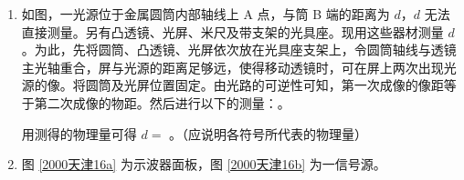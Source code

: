 \documentclass[\gkver]{gaokaozhenti}
\begin{document}
\begin{enumerate}
{（2）A、B 两球都从 O 点开始做平抛运动，且两球平抛时间相同；以平抛时间作为时间单位，则平抛的水平距离在数值上等于平抛初速度。设 A 未碰 B 时平抛水平位移为 $s_{A}$，A、B 相碰后，A、B 两球的水平位移分别为 $s_{A}'$、$s_{B}'$，A、B 质量分别为 $m_{A}$、$m_{B}$，则碰前 A 的动量可写成 $m_{A}s_{A}$，碰后 A、B 总动量为 $m_{A}s_{A}' + m_{B}s_{B}'$。要验证动量是否守恒，即验证以上两动量是否相等，所以该实验应测量的物理量有 $m_{A}$、$m_{B}$、$s_{A}'$、$s_{B}'$，故 A、B、D 正确。答案 ABD（3 分，不是 ABD 的均给零分。）
}

\item
如图，一光源位于金属圆筒内部轴线上 A 点，与筒 B 端的距离为 $d$，$d$ 无法直接测量。另有凸透镜、光屏、米尺及带支架的光具座。现用这些器材测量 $d$。为此，先将圆筒、凸透镜、光屏依次放在光具座支架上，令圆筒轴线与透镜主光轴重合，屏与光源的距离足够远，使得移动透镜时，可在屏上两次出现光源的像。将圆筒及光屏位置固定。由光路的可逆性可知，第一次成像的像距等于第二次成像的物距。然后进行以下的测量：。

用测得的物理量可得 $d=$ 。（应说明各符号所代表的物理量）



\item
图 \ref{2000天津16a} 为示波器面板，图 \ref{2000天津16b} 为一信号源。


\end{enumerate}
\end{document}
